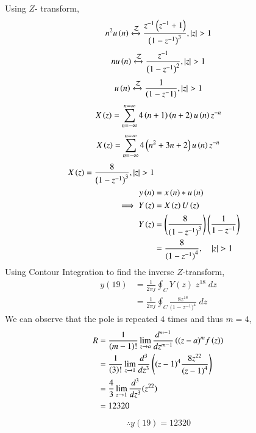 \documentclass[beamer]{IEEEtran}
\theoremstyle{remark}
\begin{document}
Using $Z$- transform,
\begin{align}
	n^2 u\left(n\right)\xleftrightarrow{\mathcal{Z}} \frac{z^{-1}\left(z^{-1}+1\right)}{\left(1-z^{-1}\right)^3} ,  \left\vert z\right\vert > 1
\end{align}
\begin{align}
	n u\left(n\right)\xleftrightarrow{\mathcal{Z}} \frac{z^{-1}}{\left(1-z^{-1}\right)^2} ,   \left\vert z\right\vert >1 
\end{align}
\begin{align}
	u\left(n\right)\xleftrightarrow{\mathcal{Z}} \frac{1}{\left(1-z^-1\right)} ,   \left\vert z\right\vert >1 
\end{align}
\begin{align}
    X\left(z\right)=\sum_{n=-\infty}^{n=\infty}4\left(n+1\right)\left(n+2\right)u\left(n\right)z^{-n}
\end{align}
\begin{align}
	X\left(z\right)=\sum_{n=-\infty}^{n=\infty}4\left(n^2+3n+2\right)u\left(n\right)z^{-n}
\end{align}
\begin{align}
	X\left(z\right)=\frac{8}{\left(1-z^{-1}\right)^3} , \left\vert z\right\vert >1\\
	y\left(n\right)&=x\left(n\right)\ast u\left(n\right)\\
	\implies Y\left(z\right)&=X\left(z\right)U\left(z\right)   \\
	 Y\left(z\right)&=\left(\frac{8}{({1-z^{-1})}^{3}}\right)\left(\frac{1}{1-z^{-1}}\right)  \\
	 &=\frac{8}{({1-z^{-1})}^{4}} ,\quad \left\vert z\right\vert>1
\end{align}
Using Contour Integration to find the inverse $Z$-transform,
\begin{align}
    y(19)&=\frac{1}{2\pi j}\oint_{C}Y(z) \;z^{18} \;dz  \\
    &=\frac{1}{2\pi j}\oint_{C}\frac{8z^{18}}{({1-z^{-1})}^{4}} \;dz 
\end{align}
We can observe that the pole is repeated $4$ times and thus $m=4$,
\begin{align}
    R&=\frac{1}{\left(m-1\right)!}\lim\limits_{z\to a}\frac{d^{m-1}}{dz^{m-1}}\left({(z-a)}^{m}f\left(z\right)\right)  \\
    &=\frac{1}{\left(3\right)!}\lim\limits_{z\to 1}\frac{d^{3}}{dz^{3}}\left({(z-1)}^{4}\frac{8z^{22}}{{(z-1)}^4}\right)   \\
	&=\frac{4}{3}\lim\limits_{z\to 1}\frac{d^3}{dz^3}(z^{22})   \\
    &=12320
\end{align}
\begin{align}
    \therefore \boxed{y(19)=12320}
\end{align}
\end{document}
